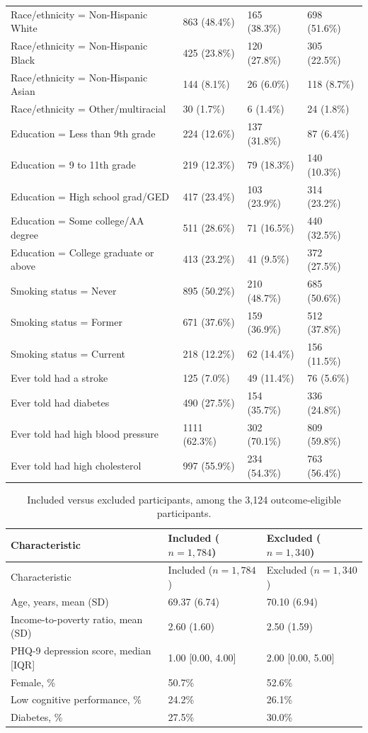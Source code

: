 \documentclass[12pt]{article}
\begin{document}
\begin{singlespace}
\begin{longtable}{L{4.6cm}R{3.35cm}R{3.35cm}R{3.35cm}}
Race/ethnicity = Non-Hispanic White & 863 (48.4\%) & 165 (38.3\%) & 698 (51.6\%) \\
Race/ethnicity = Non-Hispanic Black & 425 (23.8\%) & 120 (27.8\%) & 305 (22.5\%) \\
Race/ethnicity = Non-Hispanic Asian & 144 (8.1\%) & 26 (6.0\%) & 118 (8.7\%) \\
Race/ethnicity = Other/multiracial & 30 (1.7\%) & 6 (1.4\%) & 24 (1.8\%) \\
Education = Less than 9th grade & 224 (12.6\%) & 137 (31.8\%) & 87 (6.4\%) \\
Education = 9 to 11th grade & 219 (12.3\%) & 79 (18.3\%) & 140 (10.3\%) \\
Education = High school grad/GED & 417 (23.4\%) & 103 (23.9\%) & 314 (23.2\%) \\
Education = Some college/AA degree & 511 (28.6\%) & 71 (16.5\%) & 440 (32.5\%) \\
Education = College graduate or above & 413 (23.2\%) & 41 (9.5\%) & 372 (27.5\%) \\
Smoking status = Never & 895 (50.2\%) & 210 (48.7\%) & 685 (50.6\%) \\
Smoking status = Former & 671 (37.6\%) & 159 (36.9\%) & 512 (37.8\%) \\
Smoking status = Current & 218 (12.2\%) & 62 (14.4\%) & 156 (11.5\%) \\
Ever told had a stroke & 125 (7.0\%) & 49 (11.4\%) & 76 (5.6\%) \\
Ever told had diabetes & 490 (27.5\%) & 154 (35.7\%) & 336 (24.8\%) \\
Ever told had high blood pressure & 1111 (62.3\%) & 302 (70.1\%) & 809 (59.8\%) \\
Ever told had high cholesterol & 997 (55.9\%) & 234 (54.3\%) & 763 (56.4\%) \\
\end{longtable}

\bigskip

\begin{longtable}{p{6.0cm}R{3.5cm}R{3.5cm}}
\caption{Included versus excluded participants, among the 3,124 outcome-eligible participants.}
\label{tab:t1b}\\
\toprule
Characteristic & Included ($n=1{,}784$) & Excluded ($n=1{,}340$) \\
\midrule
\endfirsthead
\toprule
Characteristic & Included ($n=1{,}784$) & Excluded ($n=1{,}340$) \\
\midrule
\endhead
\bottomrule
\endlastfoot
Age, years, mean (SD) & 69.37 (6.74) & 70.10 (6.94) \\
Income-to-poverty ratio, mean (SD) & 2.60 (1.60) & 2.50 (1.59) \\
PHQ-9 depression score, median [IQR] & 1.00 [0.00, 4.00] & 2.00 [0.00, 5.00] \\
Female, \% & 50.7\% & 52.6\% \\
Low cognitive performance, \% & 24.2\% & 26.1\% \\
Diabetes, \% & 27.5\% & 30.0\% \\
\end{longtable}


\end{singlespace}
\end{document}
